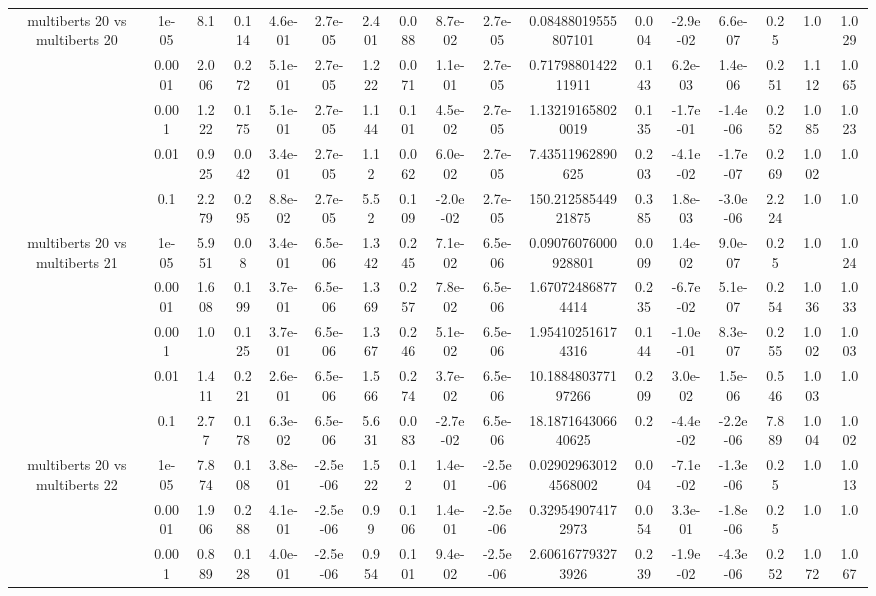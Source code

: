 \begin{tabular}{|c|c|c|c|c|c|c|c|c|c|c|c|c|c|c|c|c|}
\hline
\multirow{5}{*}{multiberts 20 vs multiberts 20} & 1e-05 & 8.1 & 0.114 & 4.6e-01 & 2.7e-05 & 2.401 & 0.088 & 8.7e-02 & 2.7e-05 & 0.08488019555807101 & 0.004 & -2.9e-02 & 6.6e-07 & 0.25 & 1.0 & 1.029 \\
 & 0.0001 & 2.006 & 0.272 & 5.1e-01 & 2.7e-05 & 1.222 & 0.071 & 1.1e-01 & 2.7e-05 & 0.7179880142211911 & 0.143 & 6.2e-03 & 1.4e-06 & 0.251 & 1.112 & 1.065 \\
 & 0.001 & 1.222 & 0.175 & 5.1e-01 & 2.7e-05 & 1.144 & 0.101 & 4.5e-02 & 2.7e-05 & 1.132191658020019 & 0.135 & -1.7e-01 & -1.4e-06 & 0.252 & 1.085 & 1.023 \\
 & 0.01 & 0.925 & 0.042 & 3.4e-01 & 2.7e-05 & 1.12 & 0.062 & 6.0e-02 & 2.7e-05 & 7.43511962890625 & 0.203 & -4.1e-02 & -1.7e-07 & 0.269 & 1.002 & 1.0 \\
 & 0.1 & 2.279 & 0.295 & 8.8e-02 & 2.7e-05 & 5.52 & 0.109 & -2.0e-02 & 2.7e-05 & 150.21258544921875 & 0.385 & 1.8e-03 & -3.0e-06 & 2.224 & 1.0 & 1.0 \\
\hline
\multirow{5}{*}{multiberts 20 vs multiberts 21} & 1e-05 & 5.951 & 0.08 & 3.4e-01 & 6.5e-06 & 1.342 & 0.245 & 7.1e-02 & 6.5e-06 & 0.09076076000928801 & 0.009 & 1.4e-02 & 9.0e-07 & 0.25 & 1.0 & 1.024 \\
 & 0.0001 & 1.608 & 0.199 & 3.7e-01 & 6.5e-06 & 1.369 & 0.257 & 7.8e-02 & 6.5e-06 & 1.670724868774414 & 0.235 & -6.7e-02 & 5.1e-07 & 0.254 & 1.036 & 1.033 \\
 & 0.001 & 1.0 & 0.125 & 3.7e-01 & 6.5e-06 & 1.367 & 0.246 & 5.1e-02 & 6.5e-06 & 1.954102516174316 & 0.144 & -1.0e-01 & 8.3e-07 & 0.255 & 1.002 & 1.003 \\
 & 0.01 & 1.411 & 0.221 & 2.6e-01 & 6.5e-06 & 1.566 & 0.274 & 3.7e-02 & 6.5e-06 & 10.188480377197266 & 0.209 & 3.0e-02 & 1.5e-06 & 0.546 & 1.003 & 1.0 \\
 & 0.1 & 2.77 & 0.178 & 6.3e-02 & 6.5e-06 & 5.631 & 0.083 & -2.7e-02 & 6.5e-06 & 18.187164306640625 & 0.2 & -4.4e-02 & -2.2e-06 & 7.889 & 1.004 & 1.002 \\
\hline
\multirow{5}{*}{multiberts 20 vs multiberts 22} & 1e-05 & 7.874 & 0.108 & 3.8e-01 & -2.5e-06 & 1.522 & 0.12 & 1.4e-01 & -2.5e-06 & 0.029029630124568002 & 0.004 & -7.1e-02 & -1.3e-06 & 0.25 & 1.0 & 1.013 \\
 & 0.0001 & 1.906 & 0.288 & 4.1e-01 & -2.5e-06 & 0.99 & 0.106 & 1.4e-01 & -2.5e-06 & 0.329549074172973 & 0.054 & 3.3e-01 & -1.8e-06 & 0.25 & 1.0 & 1.0 \\
 & 0.001 & 0.889 & 0.128 & 4.0e-01 & -2.5e-06 & 0.954 & 0.101 & 9.4e-02 & -2.5e-06 & 2.606167793273926 & 0.239 & -1.9e-02 & -4.3e-06 & 0.252 & 1.072 & 1.067 \\

\end{tabular}
